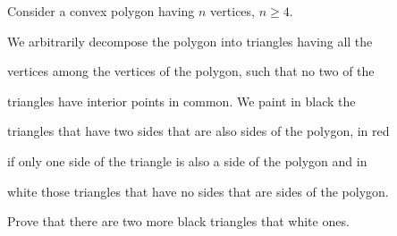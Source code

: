 Consider a convex polygon having $n$ vertices, $n\geq 4$.

 We arbitrarily decompose the polygon into triangles having all the 

vertices among the vertices of the polygon, such that no two of the 

triangles have interior points in common. We paint in black the 

triangles that have two sides that are also sides of the polygon, in red

 if only one side of the triangle is also a side of the polygon and in 

white those triangles that have no sides that are sides of the polygon.

Prove that there are two more black triangles that white ones.